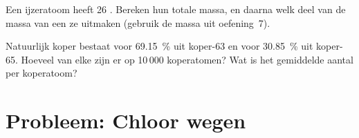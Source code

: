 \begin{exercise}[$\star\star\star$]\label{exo:g9:inside-the-atom:11}
Een ijzeratoom heeft 26 . Bereken hun totale massa, en daarna
welk deel van de massa van een   ze uitmaken
(gebruik de massa uit oefening~7).
\end{exercise}

\begin{exercise}[$\star\star\star$]\label{exo:g9:inside-the-atom:12}
Natuurlijk koper bestaat voor \qty{69.15}{\percent} uit koper-63 en voor
\qty{30.85}{\percent} uit koper-65. Hoeveel  van elke  zijn
er op 10\,000 koperatomen? Wat is het gemiddelde aantal  per
koperatoom?
\end{exercise}

\clearpage %
\section{Probleem: Chloor wegen}

